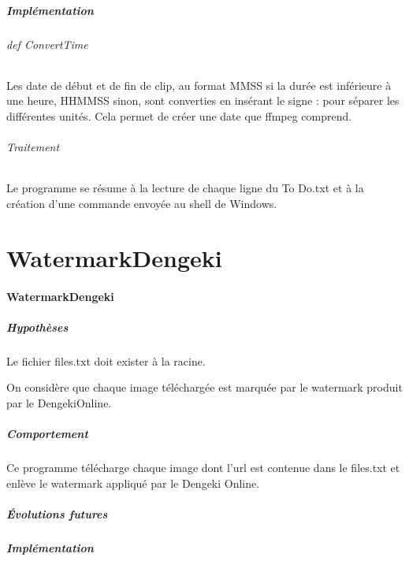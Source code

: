 \documentclass[a4paper,12pt]{article}
\begin{document}
\subsubsection{Implémentation}
\paragraph{def ConvertTime}
Les date de début et de fin de clip, au format MMSS si la durée est inférieure à une heure, HHMMSS sinon, sont converties en insérant le signe \og : \fg{} pour séparer les différentes unités. Cela permet de créer une date que ffmpeg comprend. 
\paragraph{Traitement}
Le programme se résume à la lecture de chaque ligne du To Do.txt et à la création d'une commande envoyée au shell de Windows.

\part{WatermarkDengeki}
\subsection{WatermarkDengeki}
\subsubsection{Hypothèses}
Le fichier files.txt doit exister à la racine. 

On considère que chaque image téléchargée est marquée par le watermark produit par le DengekiOnline.
\subsubsection{Comportement}
Ce programme télécharge chaque image dont l'url est contenue dans le files.txt et enlève le watermark appliqué par le Dengeki Online.
\subsubsection{Évolutions futures}
\subsubsection{Implémentation}
\end{document}
